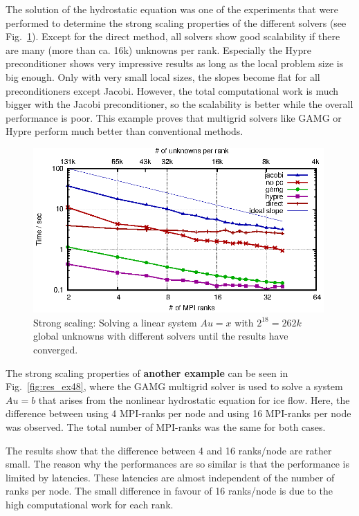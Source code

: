 The solution of the hydrostatic equation was one of the experiments that were performed to determine the strong scaling properties of the different solvers (see Fig.~\ref{fig:res_ex2_strong_time}). Except for the direct method, all solvers show good scalability if there are many (more than ca. 16k) unknowns per rank. Especially  the Hypre \cite{hypre-web-page} preconditioner shows very impressive results as long as the local problem size is big enough. Only with very small local sizes, the slopes become flat for all preconditioners except Jacobi. However, the total computational work is much bigger with the Jacobi preconditioner, so the scalability is better while the overall performance is poor. This example proves that multigrid solvers like GAMG or Hypre perform much better than conventional methods. 


\begin{figure}[tb]
	\centering
	\includegraphics[width=0.99\textwidth]{ex2_times}
	\caption{Strong scaling: Solving a linear system $Au = x$ with $2^{18} = 262k$ global unknowns with different solvers until the results have converged.} 
	\label{fig:res_ex2_strong_time}
\end{figure}

The strong scaling properties of \textbf{another example} can be seen in Fig.~\ref{fig:res_ex48}, where the GAMG multigrid solver is used to solve a system $Au = b$ that arises from the nonlinear hydrostatic equation for ice flow. Here, the difference between using 4 MPI-ranks per node and using 16 MPI-ranks per node was observed. The total number of MPI-ranks was the same for both cases.

The results show that the difference between 4 and 16 ranks/node are rather small. The reason why the performances are so similar is that the performance is limited by latencies. These latencies are almost independent of the number of ranks per node. The small difference in favour of 16 ranks/node is due to the high computational work for each rank.

